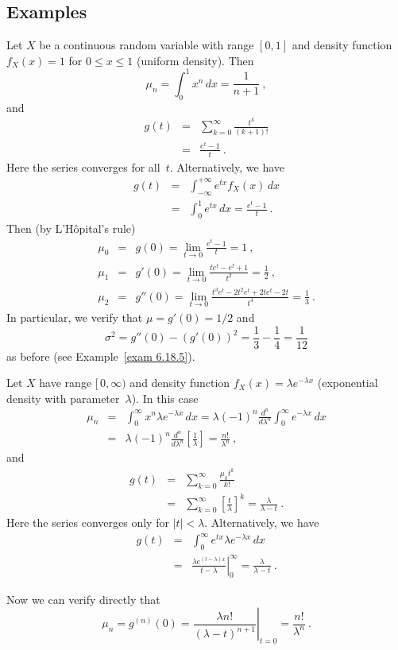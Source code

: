 \subsection*{Examples}
\begin{example}\label{exam 10.3.1}
Let $X$ be a continuous random variable with range $[0,1]$ and density
function $f_X(x) = 1$ for $0 \leq x \leq 1$ (uniform density).  Then
$$
\mu_n = \int_0^1 x^n\, dx = \frac1{n + 1}\ ,
$$
and
\begin{eqnarray*}
g(t) &=& \sum_{k = 0}^\infty \frac{t^k}{(k+1)!}\\
     &=& \frac{e^t - 1}t\ .
\end{eqnarray*}
Here the series converges for all~$t$.  Alternatively, we have
\begin{eqnarray*}
g(t) &=& \int_{-\infty}^{+\infty} e^{tx} f_X(x)\, dx \\
     &=& \int_0^1 e^{tx}\, dx = \frac{e^t - 1}t\ .
\end{eqnarray*}
Then (by L'H\^opital's rule)
\begin{eqnarray*}
\mu_0 &=& g(0) = \lim_{t \to 0} \frac{e^t - 1}t = 1\ , \\
\mu_1 &=& g'(0) = \lim_{t \to 0} \frac{te^t - e^t + 1}{t^2} = \frac12\ , \\
\mu_2 &=& g''(0) = \lim_{t \to 0} \frac{t^3e^t - 2t^2e^t + 2te^t - 2t}{t^4} =
\frac13\ .
\end{eqnarray*}
In particular, we verify that $\mu = g'(0) = 1/2$ and
$$
\sigma^2 = g''(0) - (g'(0))^2 = \frac13 - \frac14 = \frac1{12}
$$
as before (see Example~\ref{exam 6.18.5}).
\end{example}

\begin{example}\label{exam 10.3.2}
Let $X$ have range $[\,0,\infty)$ and density function $f_X(x) = \lambda
e^{-\lambda x}$ (exponential density with parameter~$\lambda$).  In this case
\begin{eqnarray*}
\mu_n &=& \int_0^\infty x^n \lambda e^{-\lambda x}\, dx = \lambda(-1)^n
\frac{d^n}{d\lambda^n} \int_0^\infty e^{-\lambda x}\, dx \\
      &=& \lambda(-1)^n \frac{d^n}{d\lambda^n} [\frac1\lambda] = \frac{n!}
{\lambda^n}\ ,
\end{eqnarray*}
and
\begin{eqnarray*}
g(t) &=& \sum_{k = 0}^\infty \frac{\mu_k t^k}{k!} \\
     &=& \sum_{k = 0}^\infty [\frac t\lambda]^k = \frac\lambda{\lambda - t}\ .
\end{eqnarray*}
Here the series converges only for $|t| < \lambda$.  Alternatively, we have
\begin{eqnarray*}
g(t) &=& \int_0^\infty e^{tx} \lambda e^{-\lambda x}\, dx \\
     &=& \left.\frac{\lambda e^{(t - \lambda)x}}{t - \lambda}\right|_0^\infty =
\frac\lambda{\lambda - t}\ .
\end{eqnarray*}

Now we can verify directly that
$$
\mu_n = g^{(n)}(0) = \left.\frac{\lambda n!}{(\lambda - t)^{n + 1}}\right|_{t =
0} = \frac{n!}{\lambda^n}\ .
$$
\end{example}

